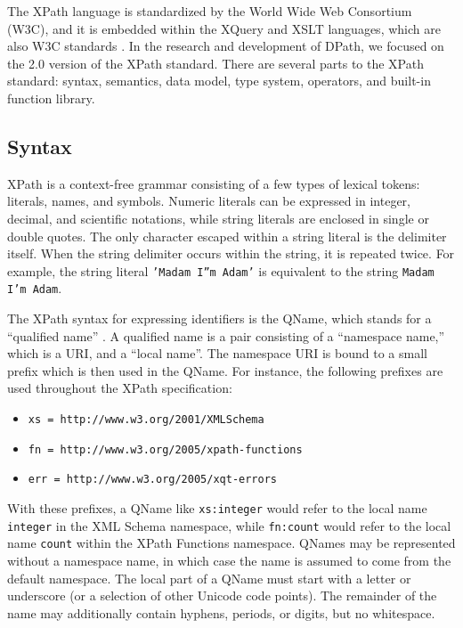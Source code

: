 \documentclass{scrartcl}
\begin{document}
The XPath language is standardized by the World Wide Web Consortium (W3C), and
it is embedded within the XQuery and XSLT languages, which are also W3C
standards \cite{xpath}. In the research and development of DPath, we focused on
the 2.0 version of the XPath standard. There are several parts to the XPath
standard: syntax\cite{xpath}, semantics\cite{xpath-semantics}, data
model\cite{xpath-datamodel}, type system, operators, and built-in function
library\cite{xpath-functions}.

\subsection{Syntax}

XPath is a context-free grammar consisting of a few types of lexical tokens:
literals, names, and symbols. Numeric literals can be expressed in integer,
decimal, and scientific notations, while string literals are enclosed in single
or double quotes. The only character escaped within a string literal is the
delimiter itself. When the string delimiter occurs within the string, it is
repeated twice. For example, the string literal \texttt{'Madam I''m Adam'} is
equivalent to the string \texttt{Madam I'm Adam}.

The XPath syntax for expressing identifiers is the QName, which stands for a
``qualified name'' \cite{xml-names}. A qualified name is a pair consisting of a
``namespace name,'' which is a URI, and a ``local name''. The namespace URI is
bound to a small prefix which is then used in the QName. For instance, the
following prefixes are used throughout the XPath specification\cite{xpath}:

\begin{itemize}
\item \texttt{xs = http://www.w3.org/2001/XMLSchema}
\item \texttt{fn = http://www.w3.org/2005/xpath-functions}
\item \texttt{err = http://www.w3.org/2005/xqt-errors}
\end{itemize}

With these prefixes, a QName like \texttt{xs:integer} would refer to the local
name \texttt{integer} in the XML Schema namespace, while \texttt{fn:count} would
refer to the local name \texttt{count} within the XPath Functions namespace.
QNames may be represented without a namespace name, in which case the name is
assumed to come from the default namespace. The local part of a QName must start
with a letter or underscore (or a selection of other Unicode code points). The
remainder of the name may additionally contain hyphens, periods, or digits, but
no whitespace.
\end{document}
